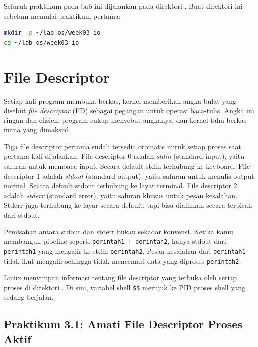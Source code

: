 \begin{notebox}
Seluruh praktikum pada bab ini dijalankan pada direktori .
Buat direktori ini sebelum memulai praktikum pertama:
\begin{lstlisting}[language=bash]
mkdir -p ~/lab-os/week03-io
cd ~/lab-os/week03-io
\end{lstlisting}
\end{notebox}

\section{File Descriptor}
\label{sec:file-descriptors}

Setiap kali program membuka berkas, kernel memberikan angka bulat yang disebut \textit{file descriptor} (FD) sebagai pegangan untuk operasi baca-tulis. Angka ini ringan dan efisien: program cukup menyebut angkanya, dan kernel tahu berkas mana yang dimaksud.

Tiga file descriptor pertama sudah tersedia otomatis untuk setiap proses saat pertama kali dijalankan. File descriptor 0 adalah \textit{stdin} (standard input), yaitu saluran untuk membaca input. Secara default stdin terhubung ke keyboard. File descriptor 1 adalah \textit{stdout} (standard output), yaitu saluran untuk menulis output normal. Secara default stdout terhubung ke layar terminal. File descriptor 2 adalah \textit{stderr} (standard error), yaitu saluran khusus untuk pesan kesalahan. Stderr juga terhubung ke layar secara default, tapi bisa dialihkan secara terpisah dari stdout.

Pemisahan antara stdout dan stderr bukan sekadar konvensi. Ketika kamu membangun pipeline seperti \texttt{perintah1 | perintah2}, hanya stdout dari \texttt{perintah1} yang mengalir ke stdin \texttt{perintah2}. Pesan kesalahan dari \texttt{perintah1} tidak ikut mengalir sehingga tidak mencemari data yang diproses \texttt{perintah2}.

Linux menyimpan informasi tentang file descriptor yang terbuka oleh setiap proses di direktori . Di sini, variabel shell \texttt{\$\$} merujuk ke PID proses shell yang sedang berjalan.

\subsection*{Praktikum 3.1: Amati File Descriptor Proses Aktif}

